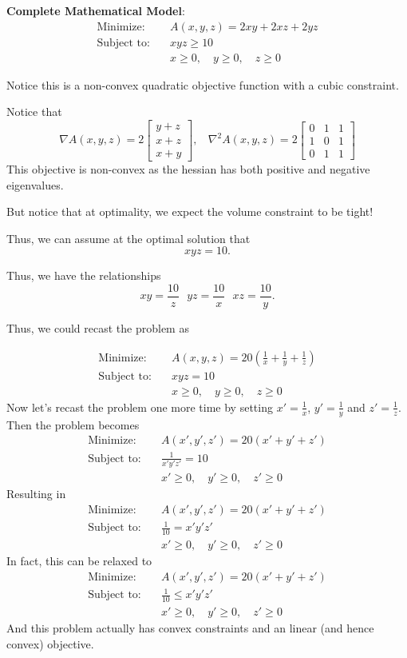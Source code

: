 \textbf{Complete Mathematical Model}:
\begin{align*}
\text{Minimize:} \quad & A(x,y,z) = 2xy + 2xz + 2yz \\
\text{Subject to:} \quad & xyz \geq 10 \\
& x \geq 0, \quad y \geq 0, \quad z \geq 0
\end{align*}

Notice this is a non-convex quadratic objective function with a cubic constraint.

Notice that 
$$
\nabla A(x,y,z) = 2\begin{bmatrix}
y + z\\ x + z \\ x + y\end{bmatrix}, 
\ \ \ \  \nabla^2 A(x,y,z) = 2 \begin{bmatrix} 0 & 1& 1\\ 1 & 0 & 1\\ 0 & 1 & 1\end{bmatrix}
$$
This objective is non-convex as the hessian has both positive and negative eigenvalues.

But notice that at optimality, we expect the volume constraint to be tight! 

Thus, we can assume at the optimal solution that 
$$
xyz = 10.
$$

Thus, we have the relationships
$$
xy = \frac{10}{z} \ \ \  yz= \frac{10}{x} \ \ \ xz = \frac{10}{y}.
$$

Thus, we could recast the problem as 

\begin{align*}
\text{Minimize:} \quad & A(x,y,z) = 20\left(\frac{1}{x} + \frac{1}{y} + \frac{1}{z}\right) \\
\text{Subject to:} \quad & xyz = 10 \\
& x \geq 0, \quad y \geq 0, \quad z \geq 0
\end{align*}
Now let's recast the problem one more time by setting $x' = \frac{1}{x}$, $y' = \frac{1}{y}$ and $z' = \frac{1}{z}$.  Then the problem becomes
\begin{align*}
\text{Minimize:} \quad & A(x',y',z') = 20\left(x'+ y' + z'\right) \\
\text{Subject to:} \quad & \frac{1}{x'y'z'} = 10 \\
& x' \geq 0, \quad y' \geq 0, \quad z' \geq 0
\end{align*}
Resulting in 
\begin{align*}
\text{Minimize:} \quad & A(x',y',z') = 20\left(x'+ y' + z'\right) \\
\text{Subject to:} \quad & \frac{1}{10} = x'y'z' \\
& x' \geq 0, \quad y' \geq 0, \quad z' \geq 0
\end{align*}
In fact, this can be relaxed to 
\begin{align*}
\text{Minimize:} \quad & A(x',y',z') = 20\left(x'+ y' + z'\right) \\
\text{Subject to:} \quad & \frac{1}{10} \leq x'y'z' \\
& x' \geq 0, \quad y' \geq 0, \quad z' \geq 0
\end{align*}
And this problem actually has convex constraints and an linear (and hence convex) objective.

